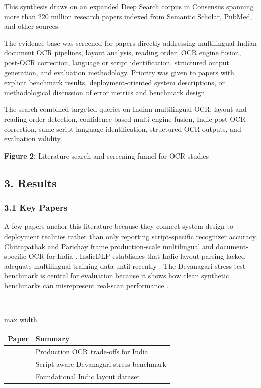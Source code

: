    
    This synthesis draws on an expanded Deep Search corpus in Consensus spanning more than 220 million research papers indexed from Semantic Scholar, PubMed, and other sources.
    
    
    The evidence base was screened for papers directly addressing multilingual Indian document OCR pipelines, layout analysis, reading order, OCR engine fusion, post-OCR correction, language or script identification, structured output generation, and evaluation methodology. Priority was given to papers with explicit benchmark results, deployment-oriented system descriptions, or methodological discussion of error metrics and benchmark design.
    
    
    The search combined targeted queries on Indian multilingual OCR, layout and reading-order detection, confidence-based multi-engine fusion, Indic post-OCR correction, same-script language identification, structured OCR outputs, and evaluation validity.
    
    
    \textbf{Figure 2:} Literature search and screening funnel for OCR studies
    
    
    \subsection*{3. Results}
    
    
    \subsubsection*{3.1 Key Papers}
    
    
    A few papers anchor this literature because they connect system design to deployment realities rather than only reporting script-specific recognizer accuracy. Chitrapathak and Parichay frame production-scale multilingual and document-specific OCR for India  \cite{Faraz2026Designing}. IndicDLP establishes that Indic layout parsing lacked adequate multilingual training data until recently  \cite{Nath2025IndicDLP:}. The Devanagari stress-test benchmark is central for evaluation because it shows how clean synthetic benchmarks can misrepresent real-scan performance  \cite{Singh2026Can}.
    
    
    \mbox{}\\
    \begin{adjustbox}{max width=\textwidth}
    \begin{tabular}{p{8.0cm} | p{8.0cm}}
    \hline
    Paper & Summary \\
    \hline
    \cite{Faraz2026Designing} & Production OCR trade-offs for India  \cite{Faraz2026Designing} \\
    \cite{Singh2026Can} & Script-aware Devanagari stress benchmark  \cite{Singh2026Can} \\
    \cite{Nath2025IndicDLP:} & Foundational Indic layout dataset  \cite{Nath2025IndicDLP:} \\
    \hline
    \end{tabular}
    \end{adjustbox}
    
